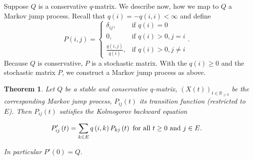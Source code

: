\documentclass[12pt,a4paper]{scrartcl}
\newtheorem{theorem}{Theorem}[section]
\numberwithin{equation}{section}
\newcommand{\R}{\mathbb{R}} %
\begin{document}
Suppose $Q$ is a conservative $q$-matrix. We describe now, how we map to $Q$ a Markov jump process.
Recall that $q\left(i\right) = -q\left(i,i\right) < \infty$ and define
$$ P\left(i,j\right) =\begin{cases} \delta_{ij}, & \mbox{if }q\left(i\right)=0 \\ 0, & \mbox{if } q\left(i\right) >0, j = i \\ \frac{q\left(i,j\right)}{q\left(i\right)}, & \mbox{if } q\left(i\right) >0,j \neq i \end{cases}. $$
Because $Q$ is conservative, $P$ is a stochastic matrix. With the $q\left(i\right)\geq 0$ and the stochastic matrix $P$, we construct a Markov jump process as above.

\begin{theorem}
Let $ Q $ be a stable and conservative $q$-matrix, $\left(X\left(t\right)\right)_{t \in \R_{\geq 0}}$ be the corresponding Markov jump process, $P_{ij}\left(t\right)$ its transition function (restricted to $E$). Then $P_{ij}\left(t\right)$ satisfies the Kolmogorov backward equation 

\begin{equation}
P_{ij}'\left(t\right) = \sum_{k \in E} q\left(i,k\right) P_{kj}\left(t\right) \textnormal{ for all } t\geq0 \textnormal{ and } j\in E.
\end{equation}

In particular $ P'\left(0\right) = Q.$
\end{theorem}
\end{document}
